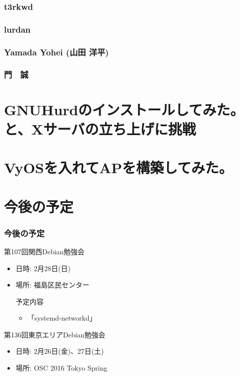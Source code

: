 \documentclass[cjk,dvipdfmx,10pt,compress,%
hyperref={bookmarks=true,bookmarksnumbered=true,bookmarksopen=false,%
colorlinks=false,%
pdftitle={第 106 回 関西 Debian 勉強会},%
pdfauthor={倉敷・のがた・佐々木・かわだ},%
pdfsubject={資料},%
}]{beamer}
\begin{document}
\begin{frame}
  \frametitle{ t3rkwd }
\end{frame}

\begin{frame}
  \frametitle{ lurdan }
\end{frame}

\begin{frame}
  \frametitle{ Yamada Yohei (山田 洋平) }
\end{frame}

\begin{frame}
  \frametitle{ 門　誠 }
\end{frame}


\section{GNUHurdのインストールしてみた。と、Xサーバの立ち上げに挑戦}

\section{VyOSを入れてAPを構築してみた。}

\section{今後の予定}
\begin{frame}[fragile]
  \frametitle{今後の予定}

  \begin{block}{第107回関西Debian勉強会}
    \begin{itemize}
    \item 日時: 2月28日(日)
    \item 場所: 福島区民センター
      \begin{block}{予定内容}
        \begin{itemize}
        \item 「systemd-networkd」
        \end{itemize}
      \end{block}
    \end{itemize}
  \end{block}

  \begin{block}{第136回東京エリアDebian勉強会}
    \begin{itemize}
    \item 日時: 2月26日(金)、27日(土)
    \item 場所: OSC 2016 Tokyo Spring
    \end{itemize}
  \end{block}

\end{frame}

\takahashi[50]{  }
\end{document}
